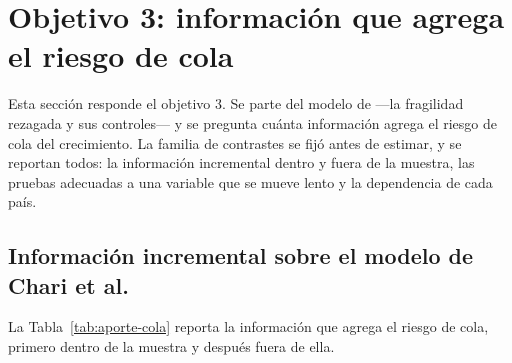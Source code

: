 \section{Objetivo 3: información que agrega el riesgo de cola}
\label{sec:aporte-cola}

Esta sección responde el objetivo 3. Se parte del modelo de \citet{Chari2024b} ---la fragilidad rezagada y sus controles--- y se pregunta cuánta información agrega el riesgo de cola del crecimiento. La familia de contrastes se fijó antes de estimar, y se reportan todos: la información incremental dentro y fuera de la muestra, las pruebas adecuadas a una variable que se mueve lento y la dependencia de cada país.

\subsection{Información incremental sobre el modelo de Chari et al.}

La Tabla~\ref{tab:aporte-cola} reporta la información que agrega el riesgo de cola, primero dentro de la muestra y después fuera de ella.

